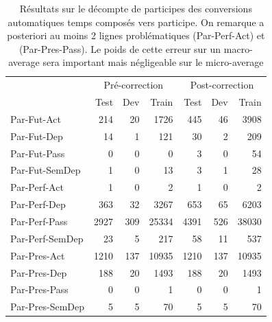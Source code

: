 \begin{table}[h]
\centering
\begin{tabular}{l|rrr|rrr}
\toprule
 & \multicolumn{3}{c}{Pré-correction} & \multicolumn{3}{c}{Post-correction} \\ 
 & Test & Dev & Train & Test & Dev & Train \\ \midrule
Par-Fut-Act & 214 & 20 & 1726 & 445 & 46 & 3908 \\
Par-Fut-Dep & 14 & 1 & 121 & 30 & 2 & 209 \\
Par-Fut-Pass & 0 & 0 & 0 & 3 & 0 & 54 \\
Par-Fut-SemDep & 1 & 0 & 13 & 3 & 1 & 28 \\
Par-Perf-Act & 1 & 0 & 2 & 1 & 0 & 2 \\
Par-Perf-Dep & 363 & 32 & 3267 & 653 & 65 & 6203 \\
Par-Perf-Pass & 2927 & 309 & 25334 & 4391 & 526 & 38030 \\
Par-Perf-SemDep & 23 & 5 & 217 & 58 & 11 & 537 \\
Par-Pres-Act & 1210 & 137 & 10935 & 1210 & 137 & 10935 \\
Par-Pres-Dep & 188 & 20 & 1493 & 188 & 20 & 1493 \\
Par-Pres-Pass & 0 & 0 & 1 & 0 & 0 & 1 \\
Par-Pres-SemDep & 5 & 5 & 70 & 5 & 5 & 70 \\ \bottomrule
\end{tabular}
\caption{Résultats sur le décompte de participes des conversions automatiques temps composés vers participe. On remarque a posteriori au moins 2 lignes problématiques (Par-Perf-Act) et (Par-Pres-Pass). Le poids de cette erreur sur un macro-average sera important mais négligeable sur le micro-average}
\label{table:lasla:correction-temps}
\end{table}

\begin{table}[ht]
\centering
{}
\caption{Résultats sur les trois formes principales du participe. En dehors d'un avantage de 2 points sur le rappel des participes présents actifs, tous les autres scores connaissent une augmentation notable, malgré une augmentation nette du nombre de données à tester.}
\label{table:lasla:main-particips}
\end{table} 

